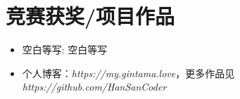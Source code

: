 \documentclass{resume}
\begin{document}

\section{竞赛获奖/项目作品}
\begin{itemize}[parsep=0.2ex]
  \item 空白等写: 空白等写
  \item 个人博客：\textit{https://my.gintama.love}，更多作品见 \textit{https://github.com/HanSanCoder}
\end{itemize}
\end{document}

